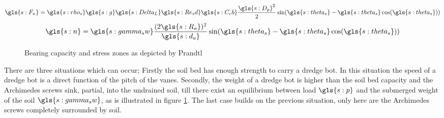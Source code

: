 \begin{sBox}
	\begin{equation}\label{eq:miedema_F_n_pipe}
		\gls{s:F_n} = \gls{s:rho_s} \gls{s:g} \gls{s:Delta_L} \gls{s:Re_sd} \gls{s:C_vb} \frac{\gls{s:D_p}^2}{2}\sin(\gls{s:theta_s}-\gls{s:theta_s}\cos(\gls{s:theta_s}))
	\end{equation}
	\begin{equation}\label{eq:normal}
	\gls{s:n} = \gls{s:gamma_sw} \frac{(2\gls{s:R_a})^2}{\gls{s:d_a}}\sin(\gls{s:theta_s}-\gls{s:theta_s}\cos(\gls{s:theta_s}))
	\end{equation}
\end{sBox}


\begin{figure}[!htb]
	\begin{center}
		\caption{Bearing capacity and stress zones as depicted by Prandtl}\label{fig:bearing capacity}
	\end{center}
\end{figure}

There are three situations which can occur; Firstly the soil bed has enough strength to carry a dredge bot. In this situation the speed of a dredge bot is a direct function of the pitch of the vanes. Secondly, the weight of a dredge bot is higher than the soil bed capacity and the Archimedes screws sink, partial, into the undrained soil, till there exist an equilibrium between load $ \gls{s:p} $ and the submerged weight of the soil $ \gls{s:gamma_sw} $, as is illustrated in figure \ref{fig:bearing capacity}. The last case builds on the previous situation, only here are the Archimedes screws completely surrounded by soil.

